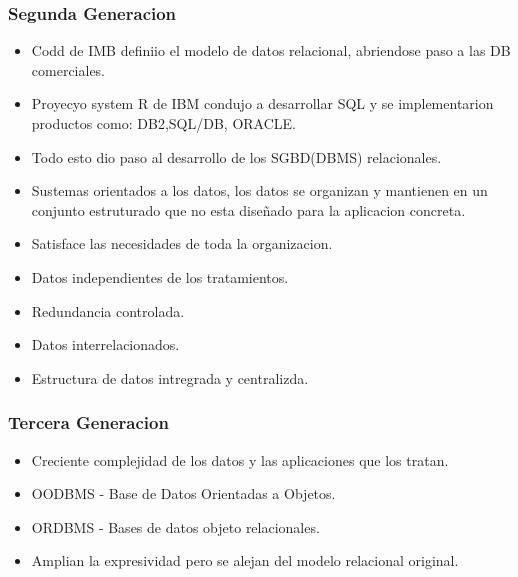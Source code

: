\documentclass{article}
\begin{document}
\begin{multicols}{2}
        \subsubsection{Segunda Generacion}
        \begin{itemize}
            \item Codd de IMB definiio el modelo de datos relacional, abriendose paso a las DB comerciales.
            \item Proyecyo system R de IBM condujo a desarrollar SQL y se implementarion productos como: DB2,SQL/DB, ORACLE.
            \item Todo esto dio paso al desarrollo de los SGBD(DBMS) relacionales.
            \item Sustemas orientados a los datos, los datos se organizan y mantienen en un conjunto estruturado que no esta diseñado para la aplicacion concreta.
            \item Satisface las necesidades de toda la organizacion.
            \item Datos independientes de los tratamientos.
            \item Redundancia controlada.
            \item Datos interrelacionados.
            \item Estructura de datos intregrada y centralizda.
        \end{itemize}


        \subsubsection{Tercera Generacion}
        \begin{itemize}
            \item Creciente complejidad de los datos y las aplicaciones que los tratan.
            \item OODBMS - Base de Datos Orientadas a Objetos.
            \item ORDBMS - Bases de datos objeto relacionales.
            \item Amplian la expresividad pero se alejan del modelo relacional original.            
        \end{itemize}

\end{multicols}
\end{document}

